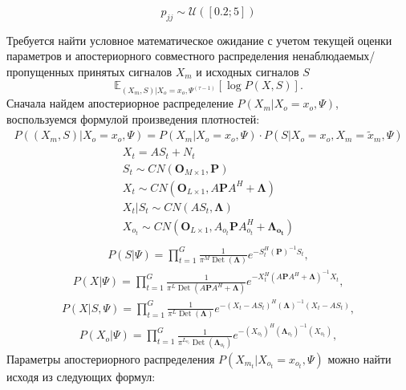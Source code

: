\documentclass[11pt]{article}
\newcommand{\Expect}{\mathbb{E}}
\DeclareMathOperator{\Det}{Det}
\begin{document}
\begin{equation}
p_{jj} \sim \mathcal{U}([0.2; 5])
\end{equation}
\begin{center}
\fontsize{14}{18}\selectfont {}
\end{center}
Требуется найти условное математическое ожидание с учетом  текущей оценки параметров и апостериорного совместного распределения ненаблюдаемых/пропущенных принятых сигналов $X_m$ и исходных сигналов $S$ 
\begin{equation}
 \Expect_{(X_m,S)|X_o=x_o, \Psi^{(\tau-1)}}[\log P(X, S)].
\end{equation}
Сначала найдем апостериорное распределение $P(X_m|X_o=x_o,\Psi)$, воспользуемся формулой произведения плотностей:
\begin{gather}
P((X_m,S)|X_o=x_o,\Psi) = P(X_m|X_o = x_o, \Psi) \cdot P(S|X_o = x_o, X_m=\widetilde{x}_m, \Psi)
\end{gather}
\begin{gather*}
X_t = AS_t + N_t \\
S_t \sim CN(\mathbf{O}_{M \times 1}, \mathbf{P}) \\
X_t \sim CN(\mathbf{O}_{L \times 1}, A\mathbf{P}A^H + \mathbf{\Lambda})\\
X_t|S_t \sim CN(AS_t,  \mathbf{\Lambda})\\
X_{o_t} \sim CN(\mathbf{O}_{L \times 1}, A_{o_t}\mathbf{P}A_{o_t}^H + \mathbf{\Lambda_{o_t}})\\
\end{gather*}
\begin{gather}
P(S|\Psi) = \prod_{t=1}^G \frac{1}{\pi^M \Det(\mathbf{\Lambda})}e^{-S_t^H (\mathbf{P})^{-1}S_t},
\end{gather}
\begin{gather}
P(X|\Psi) = \prod_{t=1}^G \frac{1}{ \pi^L \Det(A\mathbf{P}A^H + \mathbf{\Lambda}) } e^{-X_t^H (A\mathbf{P}A^H + \mathbf{\Lambda})^{-1}X_t},
\end{gather}
\begin{gather}
P(X|S,\Psi) = \prod_{t=1}^G \frac{1}{\pi^L \Det(\mathbf{\Lambda}) }e^{-(X_t-AS_t)^H (\mathbf{\Lambda})^{-1}(X_t-AS_t)},
\end{gather}
\begin{gather}
P(X_o|\Psi) = \prod_{t=1}^G \frac{1}{\pi^{L_{o_t}} \Det(\mathbf{\Lambda}_{o_t})}e^{-(X_{o_t})^H (\mathbf{\Lambda}_{o_t})^{-1}(X_{o_t})},
\end{gather}
Параметры апостериорного распределения $P(X_{m_t}|X_{o_t}=x_{o_t},\Psi)$ можно найти исходя из следующих формул:
\end{document}
